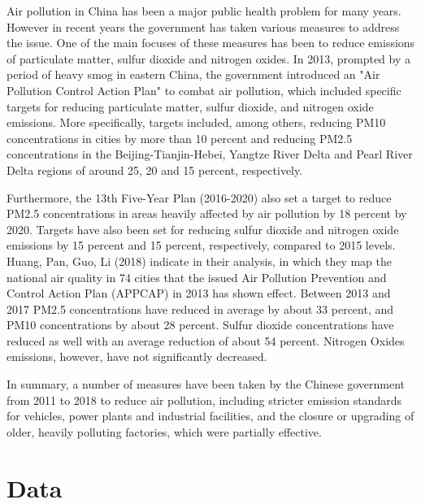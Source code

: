 \documentclass[
]{article}
\begin{document}
Air pollution in China has been a major public health problem for many years. However in recent years the government has taken various measures to address the issue. One of the main focuses of these measures has been to reduce emissions of particulate matter, sulfur dioxide and nitrogen oxides. 
In 2013, prompted by a period of heavy smog in eastern China, the government introduced an "Air Pollution Control Action Plan" to combat air pollution, which included specific targets for reducing particulate matter, sulfur dioxide, and nitrogen oxide emissions. More specifically, targets included, among others, reducing PM10 concentrations in cities by more than 10 percent and reducing PM2.5 concentrations in the Beijing-Tianjin-Hebei, Yangtze River Delta and Pearl River Delta regions of around 25, 20 and 15 percent, respectively. %

Furthermore, the 13th Five-Year Plan (2016-2020) also set a target to reduce PM2.5 concentrations in areas heavily affected by air pollution by 18 percent by 2020. Targets have also been set for reducing sulfur dioxide and nitrogen oxide emissions by 15 percent and 15 percent, respectively, compared to 2015 levels. %
Huang, Pan, Guo, Li (2018) indicate in their analysis, in which they map the national air quality in 74 cities that the issued Air Pollution Prevention and Control Action Plan (APPCAP) in 2013 has shown effect. Between 2013 and 2017 PM2.5 concentrations have reduced in average by about 33 percent, and PM10 concentrations by about 28 percent. Sulfur dioxide concentrations have reduced as well with an average reduction of about 54 percent. Nitrogen Oxides emissions, however, have not significantly decreased. %

In summary, a number of measures have been taken by the Chinese government from 2011 to 2018 to reduce air pollution, including stricter emission standards for vehicles, power plants and industrial facilities, and the closure or upgrading of older, heavily polluting factories, which were partially effective. %

\section{Data}\label{Data}
\end{document}
